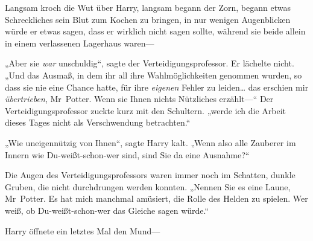 Langsam kroch die Wut über Harry, langsam begann der Zorn, begann etwas Schreckliches sein Blut zum Kochen zu bringen, in nur wenigen Augenblicken würde er etwas sagen, dass er wirklich nicht sagen sollte, während sie beide allein in einem verlassenen Lagerhaus waren—

„Aber sie \emph{war} unschuldig“, sagte der Verteidigungsprofessor. Er lächelte nicht. „Und das Ausmaß, in dem ihr all ihre Wahlmöglichkeiten genommen wurden, so dass sie nie eine Chance hatte, für ihre \emph{eigenen} Fehler zu leiden… das erschien mir \emph{übertrieben}, Mr~Potter. Wenn sie Ihnen nichts Nützliches erzählt—“ Der Verteidigungsprofessor zuckte kurz mit den Schultern. „werde ich die Arbeit dieses Tages nicht als Verschwendung betrachten.“

„Wie uneigennützig von Ihnen“, sagte Harry kalt. „Wenn also alle Zauberer im Innern wie Du-weißt-schon-wer sind, sind Sie da eine Ausnahme?“

Die Augen des Verteidigungsprofessors waren immer noch im Schatten, dunkle Gruben, die nicht durchdrungen werden konnten. „Nennen Sie es eine Laune, Mr~Potter. Es hat mich manchmal amüsiert, die Rolle des Helden zu spielen. Wer weiß, ob Du-weißt-schon-wer das Gleiche sagen würde.“

Harry öffnete ein letztes Mal den Mund—

